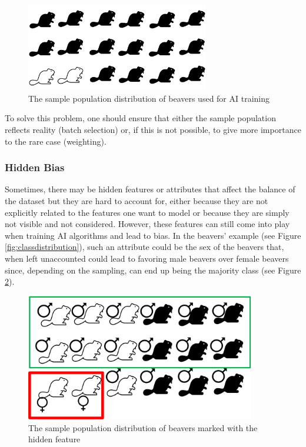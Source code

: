 \documentclass[
]{book}
\begin{document}
\begin{figure}
\includegraphics[width=8cm]{./images/classimbalance} \caption{The sample population distribution of beavers used for AI training}\label{fig:classimbalance}
\end{figure}

To solve this problem, one should ensure that either the sample population reflects reality (batch selection) or, if this is not possible, to give more importance to the rare case (weighting).

\subsubsection{Hidden Bias}\label{hidden-bias}

Sometimes, there may be hidden features or attributes that affect the balance of the dataset but they are hard to account for, either because they are not explicitly related to the features one want to model or because they are simply not visible and not considered. However, these features can still come into play when training AI algorithms and lead to bias.
In the beavers' example (see Figure \ref{fig:classdistribution}), such an attribute could be the sex of the beavers that, when left unaccounted could lead to favoring male beavers over female beavers since, depending on the sampling, can end up being the majority class (see Figure \ref{fig:beavershidden}).

\begin{figure}
\includegraphics[width=10cm]{./images/beaverssex} \caption{The sample population distribution of beavers marked with the hidden feature}\label{fig:beavershidden}
\end{figure}
\end{document}
